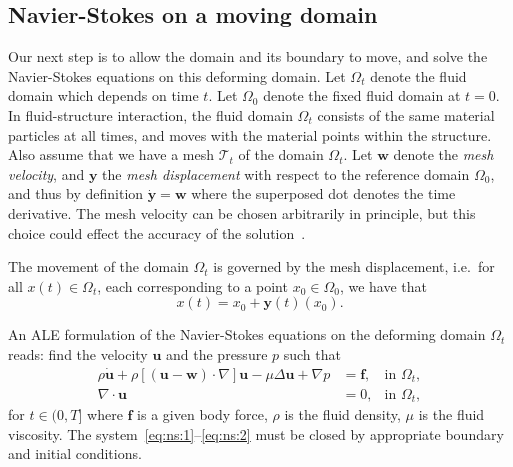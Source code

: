 \documentclass[11pt,a4paper,titlepage]{report}
\newcommand{\mesh}{\mathcal{T}_t}
\begin{document}


\subsection{Navier-Stokes on a moving domain}%



Our next step is to allow the domain and its boundary to move, and
solve the Navier-Stokes equations on this deforming domain. Let
$\Omega_t$ denote the fluid domain which depends on time $t$. Let
$\Omega_0$ denote the fixed fluid domain at $t = 0$. In
fluid-structure interaction, the fluid domain $\Omega_t$ consists of
the same material particles at all times, and moves with the material
points within the structure. Also assume that we have a mesh $\mesh$
of the domain $\Omega_t$. Let $\mathbf{w}$ denote the \emph{mesh
  velocity}, and $\mathbf{y}$ the \emph{mesh displacement} with
respect to the reference domain $\Omega_0$, and thus by definition
$\dot{\mathbf{y}} = \mathbf{w}$ where the superposed dot denotes the
time derivative. The mesh velocity can be chosen arbitrarily in
principle, but this choice could effect the accuracy of the
solution~\cite{}.

The movement of the domain $\Omega_t$ is governed by the mesh
displacement, i.e.~for all $x(t) \in \Omega_t$, each corresponding to
a point $x_0 \in \Omega_0$, we have that
\begin{equation}
  x(t) = x_0 + \mathbf{y}(t)(x_0).
\end{equation}

An ALE formulation of the Navier-Stokes equations on the deforming
domain $\Omega_t$ reads: find the velocity $\mathbf{u}$ and the
pressure $p$ such that
\begin{align}
  \label{eq:ns:1}
  \rho \dot{\mathbf{u}}
  + \rho [(\mathbf{u - w}) \cdot \nabla] \mathbf{u}
  - \mu \Delta \mathbf{u} + \nabla p
  &= \mathbf{f},  & \text{in } \Omega_t, \\
  \label{eq:ns:2}
  \nabla \cdot \mathbf{u} &= 0, & \text{in } \Omega_t,
\end{align}
for $t \in (0, T]$ where $\mathbf{f}$ is a given body force, $\rho$ is
  the fluid density, $\mu$ is the fluid viscosity. The
  system~\eqref{eq:ns:1}--\eqref{eq:ns:2} must be closed by
  appropriate boundary and initial conditions.
\end{document}
